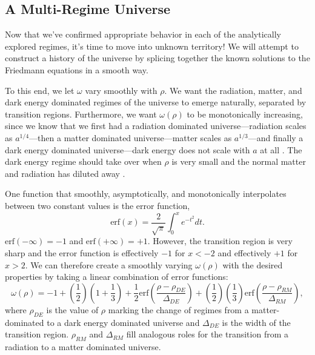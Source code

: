 \documentclass[]{article}
\newcommand{\erf}{\text{erf}}
\begin{document}
\subsection{A Multi-Regime Universe}
\label{subsec:multi-regime}

Now that we've confirmed appropriate behavior in each of the
analytically explored regimes, it's time to move into unknown
territory! We will attempt to construct a history of the universe by
splicing together the known solutions to the Friedmann equations in a
smooth way. 

To this end, we let $\omega$ vary smoothly with $\rho$. We want the
radiation, matter, and dark energy dominated regimes of the universe
to emerge naturally, separated by transition regions. Furthermore, we
want $\omega(\rho)$ to be monotonically increasing, since we know that
we first had a radiation dominated universe---radiation scales as
$a^{1/4}$---then a matter dominated universe---matter scales as
$a^{1/3}$---and finally a dark energy dominated universe---dark energy
does not scale with $a$ at all
\cite{Carroll,MisnerThorneWheeler,Kempf}. The dark energy regime
should take over when $\rho$ is very small and the normal matter and
radiation has diluted away \cite{Carroll,MisnerThorneWheeler,Kempf}.

One function that smoothly, asymptotically, and monotonically
interpolates between two constant values is the error function,
\begin{equation}
  \label{eq:def:error:function}
  \erf(x) = \frac{2}{\sqrt{\pi}}\int_0^x e^{-t^2}dt.
\end{equation}
$\erf(-\infty)=-1$ and $\erf(+\infty)=+1$. However, the transition
region is very sharp and the error function is effectively $-1$ for
$x<-2$ and effectively $+1$ for $x>2$. We can therefore create a
smoothly varying $\omega(\rho)$ with the desired properties by taking
a linear combination of error functions:
\begin{equation}
  \label{eq:interpolating:function}
  \omega(\rho) = -1 + \left(\frac{1}{2}\right) \left(1+\frac{1}{3}\right) + \frac{1}{2}\erf\left(\frac{\rho - \rho_{DE}}{\Delta_{DE}}\right) + \left(\frac{1}{2}\right)\left(\frac{1}{3}\right)\erf\left(\frac{\rho - \rho_{RM}}{\Delta_{RM}}\right),
\end{equation}
where $\rho_{DE}$ is the value of $\rho$ marking the change of regimes
from a matter-dominated to a dark energy dominated universe and
$\Delta_{DE}$ is the width of the transition region. $\rho_{RM}$ and
$\Delta_{RM}$ fill analogous roles for the transition from a radiation
to a matter dominated universe.
\end{document}
